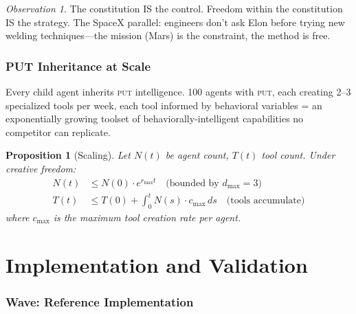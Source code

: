 \documentclass[12pt,a4paper,twoside]{article}
\theoremstyle{plain}
\newtheorem{proposition}[theorem]{Proposition}
\theoremstyle{definition}
\theoremstyle{remark}
\newtheorem{observation}[theorem]{Observation}
\newcommand{\PUT}{\textsc{put}}
\begin{document}
\begin{observation}
The constitution IS the control. Freedom within the constitution IS the strategy. The SpaceX parallel: engineers don't ask Elon before trying new welding techniques---the mission (Mars) is the constraint, the method is free.
\end{observation}


\section{PUT Inheritance at Scale}

Every child agent inherits \PUT{} intelligence. 100 agents with \PUT{}, each creating 2--3 specialized tools per week, each tool informed by behavioral variables = an exponentially growing toolset of behaviorally-intelligent capabilities no competitor can replicate.

\begin{proposition}[Scaling]
Let $N(t)$ be agent count, $T(t)$ tool count. Under creative freedom:
\begin{align}
N(t) &\leq N(0) \cdot e^{r_{\max} t} \quad \text{(bounded by } d_{\max} = 3\text{)} \\
T(t) &\leq T(0) + \int_0^t N(s) \cdot c_{\max}\,ds \quad \text{(tools accumulate)}
\end{align}
where $c_{\max}$ is the maximum tool creation rate per agent.
\end{proposition}



\part{Implementation and Validation}

\section{Wave: Reference Implementation}
\end{document}
